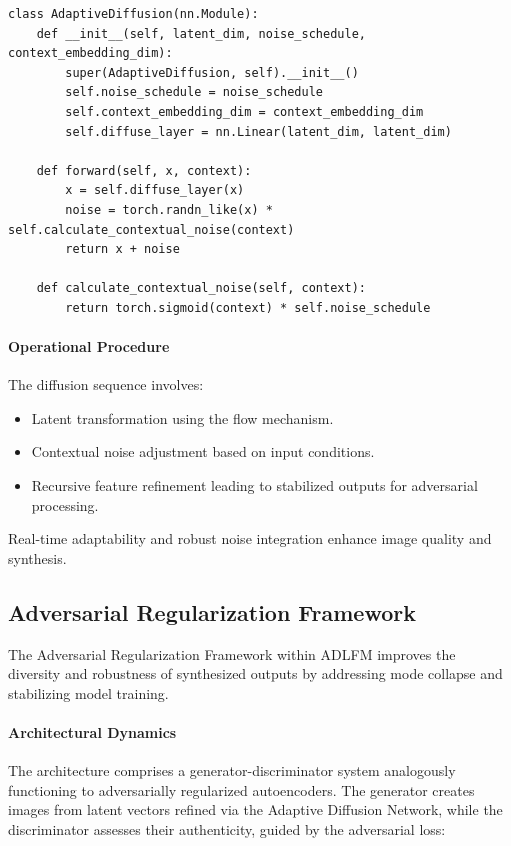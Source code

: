\begin{lstlisting}
class AdaptiveDiffusion(nn.Module):
    def __init__(self, latent_dim, noise_schedule, context_embedding_dim):
        super(AdaptiveDiffusion, self).__init__()
        self.noise_schedule = noise_schedule
        self.context_embedding_dim = context_embedding_dim
        self.diffuse_layer = nn.Linear(latent_dim, latent_dim)
        
    def forward(self, x, context):
        x = self.diffuse_layer(x)
        noise = torch.randn_like(x) * self.calculate_contextual_noise(context)
        return x + noise
        
    def calculate_contextual_noise(self, context):
        return torch.sigmoid(context) * self.noise_schedule
\end{lstlisting}

\paragraph{Operational Procedure}

The diffusion sequence involves:
\begin{itemize}
    \item Latent transformation using the flow mechanism.
    \item Contextual noise adjustment based on input conditions.
    \item Recursive feature refinement leading to stabilized outputs for adversarial processing.
\end{itemize}

Real-time adaptability and robust noise integration enhance image quality and synthesis.

\subsection{Adversarial Regularization Framework}

The Adversarial Regularization Framework within ADLFM improves the diversity and robustness of synthesized outputs by addressing mode collapse and stabilizing model training.

\paragraph{Architectural Dynamics}

The architecture comprises a generator-discriminator system analogously functioning to adversarially regularized autoencoders. The generator creates images from latent vectors refined via the Adaptive Diffusion Network, while the discriminator assesses their authenticity, guided by the adversarial loss:


